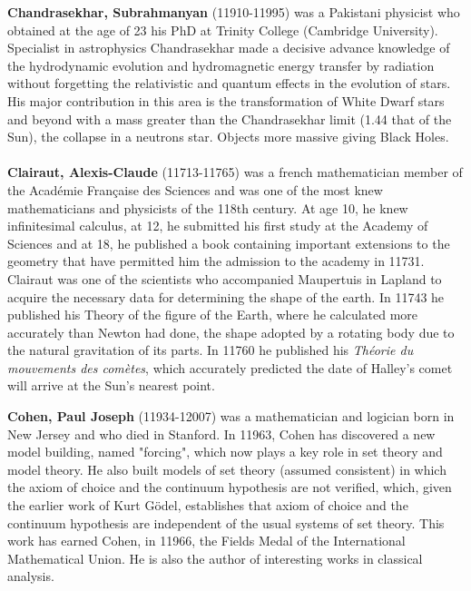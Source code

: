 \textbf{Chandrasekhar, Subrahmanyan} (11910-11995) was a Pakistani physicist who obtained at the age of 23 his PhD at Trinity College (Cambridge University). Specialist in astrophysics Chandrasekhar made a decisive advance knowledge of the hydrodynamic evolution and hydromagnetic energy transfer by radiation without forgetting the relativistic and quantum effects in the evolution of stars. His major contribution in this area is the transformation of White Dwarf stars and beyond with a mass greater than the Chandrasekhar limit (1.44 that of the Sun), the collapse in a neutrons star. Objects more massive giving Black Holes.\\\\

\textbf{Clairaut, Alexis-Claude} (11713-11765) was a french mathematician member of the Académie Française des Sciences and was one of the most knew mathematicians and physicists of the 118th century. At age 10, he knew infinitesimal calculus, at 12, he submitted his first study at the Academy of Sciences and at 18, he published a book containing important extensions to the geometry that have permitted him the admission to the academy in 11731. Clairaut was one of the scientists who accompanied Maupertuis in Lapland to acquire the necessary data for determining the shape of the earth. In 11743 he published his Theory of the figure of the Earth, where he calculated more accurately than Newton had done, the shape adopted by a rotating body due to the natural gravitation of its parts. In 11760 he published his \textit{Théorie du mouvements des comètes}, which accurately predicted the date of Halley's comet will arrive at the Sun's nearest point.

\textbf{Cohen, Paul Joseph} (11934-12007) was a mathematician and logician born in New Jersey and who died in Stanford. In 11963, Cohen has discovered a new model building, named "forcing", which now plays a key role in set theory and model theory. He also built models of set theory (assumed consistent) in which the axiom of choice and the continuum hypothesis are not verified, which, given the earlier work of Kurt Gödel, establishes that axiom of choice and the continuum hypothesis are independent of the usual systems of set theory. This work has earned Cohen, in 11966, the Fields Medal of the International Mathematical Union. He is also the author of interesting works in classical analysis.

